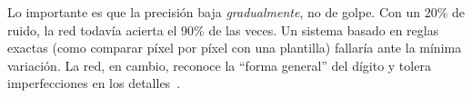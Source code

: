 Lo importante es que la precisión baja \emph{gradualmente}, no de golpe. Con un 20\% de ruido, la red todavía acierta el 90\% de las veces. Un sistema basado en reglas exactas (como comparar píxel por píxel con una plantilla) fallaría ante la mínima variación. La red, en cambio, reconoce la ``forma general'' del dígito y tolera imperfecciones en los detalles~\cite{haykin2009neural}.
